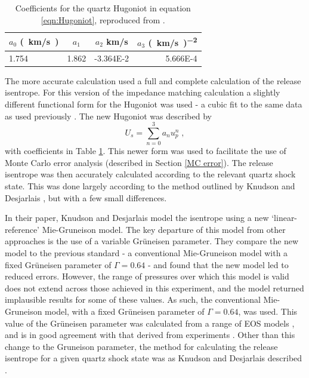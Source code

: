 \begin{table}%
\centering
\caption{\label{tab:HugoniotCoeffs}%
Coefficients for the quartz Hugoniot in equation \ref{eqn:Hugoniot}, reproduced from \cite{Knudson2013}.
}
\begin{tabular}{lccr}
\hline\hline
\textrm{$a_0$ \si[per-mode=symbol]{(km/s)}}&
\textrm{$a_1$}&
\textrm{$a_2$ \si[per-mode=symbol]{\kilo\meter\per\second} }&
\textrm{$a_3$ \si[per-mode=symbol]{(km/s)^{-2}} } \\
\hline
1.754 & \num{1.862} & \num{-3.364E-2} & \num{5.666E-4}\\
\hline\hline
\end{tabular}
\end{table}

The more accurate calculation used a full and complete calculation of the release isentrope. For this version of the impedance matching calculation a slightly different functional form for the Hugoniot was used \cite{Knudson2013} - a cubic fit to the same data as used previously \cite{Knudson2009}. The new Hugoniot was described by \begin{equation} \label{eqn:Hugoniot} U_s = \sum_{n=0}^3 a_n u_p^n \;, \end{equation} with coefficients in Table \ref{tab:HugoniotCoeffs}. This newer form was used to facilitate the use of Monte Carlo error analysis (described in Section \ref{MC error}). The release isentrope was then accurately calculated according to the relevant quartz shock state. This was done largely according to the method outlined by Knudson and Desjarlais \cite{Knudson2013}, but with a few small differences. 

In their paper, Knudson and Desjarlais model the isentrope using a new `linear-reference' Mie-Gruneison model. The key departure of this model from other approaches is the use of a variable Gr{\"u}neisen parameter. They compare the new model to the previous standard - a conventional Mie-Gruneison model with a fixed Gr{\"u}neisen parameter of $\Gamma = 0.64$ - and found that the new model led to reduced errors. However, the range of pressures over which this model is valid does not extend across those achieved in this experiment, and the model  returned implausible results for some of these values. As such, the conventional Mie-Gruneison model, with a fixed Gr{\"u}neisen parameter of $\Gamma = 0.64$, was used. This value of the Gr{\"u}neisen parameter was calculated from a range of EOS models \cite{Hicks2008}, and is in good agreement with that derived \cite{Hicks2008} from experiments \cite{Hicks2005, Trunin1994}. Other than this change to the Gruneison parameter, the method for calculating the release isentrope for a given quartz shock state was as Knudson and Desjarlais described \cite{Knudson2013}.

